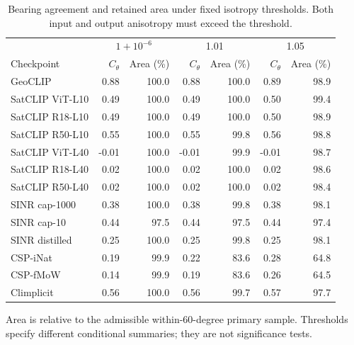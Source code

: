 \begin{table}[htbp]\centering\small
\caption{Bearing agreement and retained area under fixed isotropy thresholds. Both input and output anisotropy must exceed the threshold.}
\label{tab:bearing}
\begin{tabular}{@{}lrrrrrr@{}}\toprule
&\multicolumn{2}{c}{$1+10^{-6}$}&\multicolumn{2}{c}{1.01}&\multicolumn{2}{c}{1.05}\\Checkpoint&$C_\theta$&Area (\%)&$C_\theta$&Area (\%)&$C_\theta$&Area (\%)\\\midrule
GeoCLIP&0.88&100.0&0.88&100.0&0.89&98.9\\
SatCLIP ViT-L10&0.49&100.0&0.49&100.0&0.50&99.4\\
SatCLIP R18-L10&0.49&100.0&0.49&100.0&0.50&98.9\\
SatCLIP R50-L10&0.55&100.0&0.55&99.8&0.56&98.8\\
SatCLIP ViT-L40&-0.01&100.0&-0.01&99.9&-0.01&98.7\\
SatCLIP R18-L40&0.02&100.0&0.02&100.0&0.02&98.6\\
SatCLIP R50-L40&0.02&100.0&0.02&100.0&0.02&98.4\\
SINR cap-1000&0.38&100.0&0.38&99.8&0.38&98.1\\
SINR cap-10&0.44&97.5&0.44&97.5&0.44&97.4\\
SINR distilled&0.25&100.0&0.25&99.8&0.25&98.1\\
CSP-iNat&0.19&99.9&0.22&83.6&0.28&64.8\\
CSP-fMoW&0.14&99.9&0.19&83.6&0.26&64.5\\
Climplicit&0.56&100.0&0.56&99.7&0.57&97.7\\
\bottomrule\end{tabular}
\par\smallskip\parbox{.97\textwidth}{\footnotesize Area is relative to the admissible within-60-degree primary sample. Thresholds specify different conditional summaries; they are not significance tests.}
\end{table}
